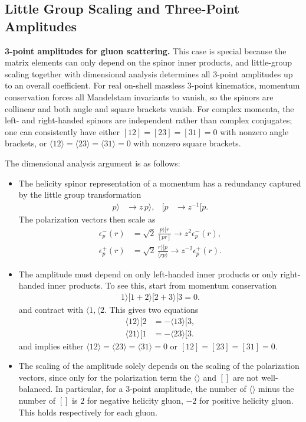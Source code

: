 \subsection{Little Group Scaling and Three-Point Amplitudes}
\label{subsec:little-group-scaling-and-three-point-amplitudes}

\textbf{3-point amplitudes for gluon scattering.} This case is special because the matrix elements can only depend on the spinor inner products, and little-group scaling together with dimensional analysis determines all 3-point amplitudes up to an overall coefficient. For real on-shell massless 3-point kinematics, momentum conservation forces all Mandelstam invariants to vanish, so the spinors are collinear and both angle and square brackets vanish. For complex momenta, the left- and right-handed spinors are independent rather than complex conjugates; one can consistently have either $[12]=[23]=[31]=0$ with nonzero angle brackets, or $\langle 12\rangle=\langle 23\rangle=\langle 31\rangle=0$ with nonzero square brackets. 

The dimensional analysis argument is as follows: 
\begin{itemize}
	\item The helicity spinor representation of a momentum has a redundancy captured by the little group transformation
	\begin{align*}
		p\rangle &\longrightarrow z\,p\rangle,
		& [p &\longrightarrow z^{-1}[p.
	\end{align*}
	The polarization vectors then scale as
	\begin{align*}
		\epsilon_p^{-}(r)
		&= \sqrt{2}\,\frac{p\rangle [r}{[p r]}
		\longrightarrow z^2\epsilon_p^{-}(r), \\
		\epsilon_p^{+}(r)
		&= \sqrt{2}\,\frac{r\rangle [p}{\langle r p\rangle}
		\longrightarrow z^{-2}\epsilon_p^{+}(r).
	\end{align*}
	\item The amplitude must depend on only left-handed inner products or only right-handed inner products. To see this, start from momentum conservation
	\begin{align*}
		1\rangle [1 + 2\rangle [2 + 3\rangle [3 = 0.
	\end{align*}
	and contract with $\langle 1, \langle 2$. This gives two equations
	\begin{align*}
		\langle 12\rangle [2 &= -\langle 13\rangle [3, \\
		\langle 21\rangle [1 &= -\langle 23\rangle [3.
	\end{align*}
	and implies either $\langle 12\rangle = \langle 23\rangle = \langle 31\rangle = 0$ or $[12] = [23] = [31] = 0$. 
	\item The scaling of the amplitude solely depends on the scaling of the polarization vectors, since only for the polarization term the $\langle \rangle$ and $[]$ are not well-balanced. In particular, for a 3-point amplitude, the number of $\langle \rangle$ minus the number of $[]$ is $2$ for negative helicity gluon, $-2$ for positive helicity gluon. This holds respectively for each gluon.
\end{itemize}

